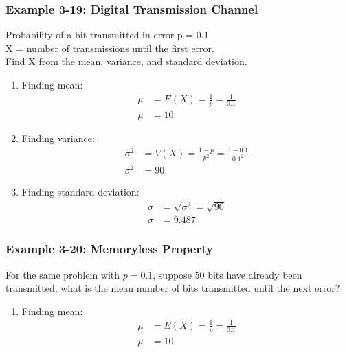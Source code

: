 \documentclass[../INDE315.tex]{subfiles}
\begin{document}
\subsubsection*{Example 3-19: Digital Transmission Channel}
\begin{exmp}
    Probability of a bit transmitted in error p = 0.1 \\
    X = number of transmissions until the first error. \\
    Find X from the mean, variance, and standard deviation.
\end{exmp}
\begin{enumerate}
    \item Finding mean:
        \begin{equation*}
            \begin{aligned}
                \mu &= E(X) = \frac{1}{p} = \frac{1}{0.1} \\
                \mu &= 10
            \end{aligned}
        \end{equation*}
    \item Finding variance:
        \begin{equation*}
            \begin{aligned}
                \sigma ^2 &= V(X) = \frac{1-p}{p^2} = \frac{1-0.1}{0.1^2} \\
                \sigma ^2 &= 90
            \end{aligned}
        \end{equation*}
    \item Finding standard deviation:
        \begin{equation*}
            \begin{aligned}
                \sigma &= \sqrt{\sigma ^2} = \sqrt{90} \\
                \sigma &= 9.487
            \end{aligned}
        \end{equation*}
\end{enumerate}

\subsubsection*{Example 3-20: Memoryless Property}
\begin{exmp}
    For the same problem with $p = 0.1$, suppose 50 bits have already been transmitted, what is the mean number of bits transmitted until the next error?
\end{exmp}
\begin{enumerate}
    \item Finding mean:
        \begin{equation*}
            \begin{aligned}
                \mu &= E(X) = \frac{1}{p} = \frac{1}{0.1} \\
                \mu &= 10
            \end{aligned}
        \end{equation*}
\end{enumerate}
\end{document}
